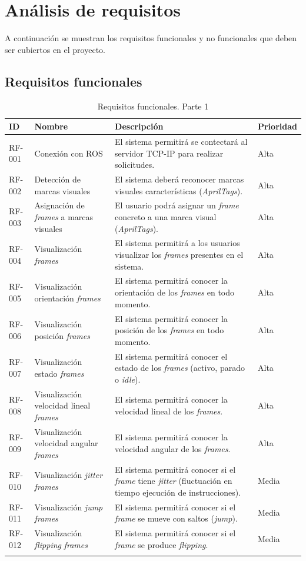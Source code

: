 \newpage

\section{Análisis de requisitos}
A continuación se muestran los requisitos funcionales y no funcionales que deben ser cubiertos en el proyecto.

\subsection{Requisitos funcionales}
\begin{longtable}{|p{2cm}|p{4cm}|p{7cm}|p{2cm}|}
\hline
\textbf{ID} & \textbf{Nombre} & \textbf{Descripción} & \textbf{Prioridad} \\
\hline
RF-001 & Conexión con ROS & El sistema permitirá se contectará al servidor TCP-IP para realizar solicitudes. & Alta \\
\hline
RF-002 & Detección de marcas visuales & El sistema deberá reconocer marcas visuales características (\textit{AprilTags}).  & Alta \\
\hline
RF-003 & Asignación de \textit{frames} a marcas visuales & El usuario podrá asignar un \textit{frame} concreto a una marca visual (\textit{AprilTags}).  & Alta \\
\hline
RF-004 & Visualización \textit{frames} & El sistema permitirá a los usuarios visualizar los \textit{frames} presentes en el sistema. & Alta \\
\hline
RF-005 & Visualización orientación \textit{frames} & El sistema permitirá conocer la orientación de los \textit{frames} en todo momento.  & Alta \\
\hline
RF-006 & Visualización posición \textit{frames} & El sistema permitirá conocer la posición de los \textit{frames} en todo momento.  & Alta \\
\hline
RF-007 & Visualización estado \textit{frames} & El sistema permitirá conocer el estado de los \textit{frames} (activo, parado o \textit{idle}). & Alta \\
\hline
RF-008 & Visualización velocidad lineal \textit{frames} & El sistema permitirá conocer la velocidad lineal de los \textit{frames}. & Alta \\
\hline
RF-009 & Visualización velocidad angular \textit{frames} & El sistema permitirá conocer la velocidad angular de los \textit{frames}. & Alta \\
\hline
RF-010 & Visualización \textit{jitter} \textit{frames} & El sistema permitirá conocer si el \textit{frame} tiene \textit{jitter} (fluctuación en tiempo ejecución de instrucciones). & Media \\
\hline
RF-011 & Visualización \textit{jump} \textit{frames} & El sistema permitirá conocer si el \textit{frame} se mueve con saltos (\textit{jump}). & Media \\
\hline
RF-012 & Visualización \textit{flipping} \textit{frames} & El sistema permitirá conocer si el \textit{frame} se produce \textit{flipping}. & Media \\
\hline
\caption{Requisitos funcionales. Parte 1}
\end{longtable}


